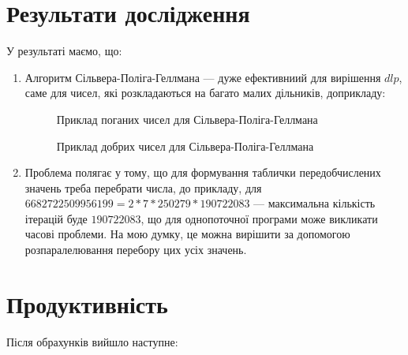 \pagebreak

\section{Результати дослідження}
У результаті маємо, що:
\begin{enumerate}
\item Алгоритм Сільвера-Поліга-Геллмана --- дуже ефективниий для вирішення $dlp$, саме для чисел, які розкладаються на багато малих дільників, доприкладу: 


\begin{figure}[h]
			\caption{Приклад поганих чисел для Сільвера-Поліга-Геллмана}
			\label{fig:image}
		\end{figure}
		
\begin{figure}[h]
			\caption{Приклад добрих чисел для Сільвера-Поліга-Геллмана}
			\label{fig:image}
		\end{figure}

\item Проблема полягає у тому, що для формування таблички передобчислених значень треба перебрати числа, до прикладу, для $6682722509956199 = 2*7*250279*190722083$ --- максимальна кількість ітерацій буде $190722083$, що для однопоточної програми може викликати часові проблеми. На мою думку, це можна вирішити за допомогою розпаралелювання перебору цих усіх значень.

\end{enumerate}

\pagebreak
\section{Продуктивність}
\vspace{3mm}
Після обрахунків вийшло наступне:

